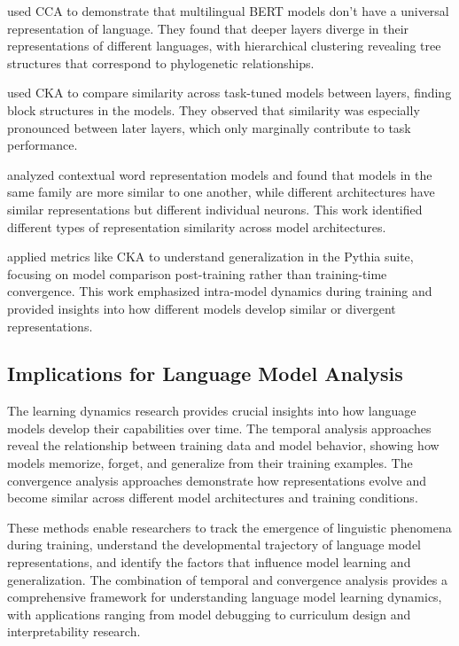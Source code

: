 \citet{singh2019bert} used CCA to demonstrate that multilingual BERT models don't have a universal representation of language. They found that deeper layers diverge in their representations of different languages, with hierarchical clustering revealing tree structures that correspond to phylogenetic relationships.

\citet{phang2021finetuned} used CKA to compare similarity across task-tuned models between layers, finding block structures in the models. They observed that similarity was especially pronounced between later layers, which only marginally contribute to task performance.

\citet{wu2020similarity} analyzed contextual word representation models and found that models in the same family are more similar to one another, while different architectures have similar representations but different individual neurons. This work identified different types of representation similarity across model architectures.

\citet{brown2023understanding} applied metrics like CKA to understand generalization in the Pythia suite, focusing on model comparison post-training rather than training-time convergence. This work emphasized intra-model dynamics during training and provided insights into how different models develop similar or divergent representations.

\subsection{Implications for Language Model Analysis}

The learning dynamics research provides crucial insights into how language models develop their capabilities over time. The temporal analysis approaches reveal the relationship between training data and model behavior, showing how models memorize, forget, and generalize from their training examples. The convergence analysis approaches demonstrate how representations evolve and become similar across different model architectures and training conditions.

These methods enable researchers to track the emergence of linguistic phenomena during training, understand the developmental trajectory of language model representations, and identify the factors that influence model learning and generalization. The combination of temporal and convergence analysis provides a comprehensive framework for understanding language model learning dynamics, with applications ranging from model debugging to curriculum design and interpretability research.
